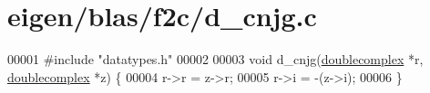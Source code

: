 \hypertarget{eigen_2blas_2f2c_2d__cnjg_8c_source}{}\section{eigen/blas/f2c/d\+\_\+cnjg.c}
\label{eigen_2blas_2f2c_2d__cnjg_8c_source}

\begin{DoxyCode}
00001 \textcolor{preprocessor}{#include "datatypes.h"}    
00002 
00003 \textcolor{keywordtype}{void} d\_cnjg(\hyperlink{structdoublecomplex}{doublecomplex} *r, \hyperlink{structdoublecomplex}{doublecomplex} *z) \{
00004     r->r = z->r;
00005     r->i = -(z->i);
00006 \}
\end{DoxyCode}
